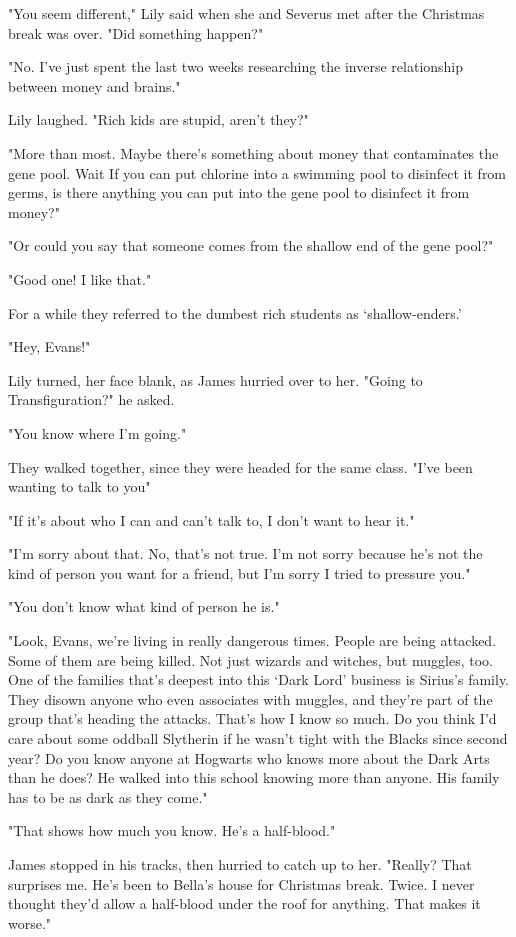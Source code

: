 "You seem different," Lily said when she and Severus met after the Christmas break was over. "Did something happen?"

"No. I've just spent the last two weeks researching the inverse relationship between money and brains."

Lily laughed. "Rich kids are stupid, aren't they?"

"More than most. Maybe there's something about money that contaminates the gene pool. Wait{\el} If you can put chlorine into a swimming pool to disinfect it from germs, is there anything you can put into the gene pool to disinfect it from money?"

"Or could you say that someone comes from the shallow end of the gene pool?"

"Good one! I like that."

For a while they referred to the dumbest rich students as `shallow-enders.'

"Hey, Evans!"

Lily turned, her face blank, as James hurried over to her. "Going to Transfiguration?" he asked.

"You know where I'm going."

They walked together, since they were headed for the same class. "I've been wanting to talk to you{\el}"

"If it's about who I can and can't talk to, I don't want to hear it."

"I'm sorry about that. No, that's not true. I'm not sorry because he's not the kind of person you want for a friend, but I'm sorry I tried to pressure you."

"You don't know what kind of person he is."

"Look, Evans, we're living in really dangerous times. People are being attacked. Some of them are being killed. Not just wizards and witches, but muggles, too. One of the families that's deepest into this `Dark Lord' business is Sirius's family. They disown anyone who even associates with muggles, and they're part of the group that's heading the attacks. That's how I know so much. Do you think I'd care about some oddball Slytherin if he wasn't tight with the Blacks since second year? Do you know anyone at Hogwarts who knows more about the Dark Arts than he does? He walked into this school knowing more than anyone. His family has to be as dark as they come."

"That shows how much you know. He's a half-blood."

James stopped in his tracks, then hurried to catch up to her. "Really? That surprises me. He's been to Bella's house for Christmas break. Twice. I never thought they'd allow a half-blood under the roof for anything. That makes it worse."

